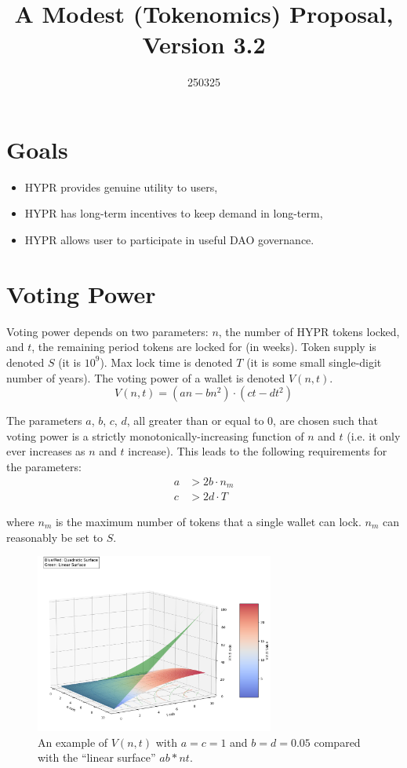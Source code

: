 \documentclass{article}
\title{A Modest (Tokenomics) Proposal, Version 3.2}
\date{250325}
\author{}
\begin{document}
\maketitle

\section{Goals}\label{sec:goals}
\begin{itemize}
    \item HYPR provides genuine utility to users,
    \item HYPR has long-term incentives to keep demand in long-term,
    \item HYPR allows user to participate in useful DAO governance.
\end{itemize}

\section{Voting Power}\label{sec:votingpower}

Voting power depends on two parameters: $n$, the number of HYPR tokens locked, and $t$, the remaining period tokens are locked for (in weeks).
Token supply is denoted $S$ (it is $10^9$).
Max lock time is denoted $T$ (it is some small single-digit number of years).
The voting power of a wallet is denoted $V(n, t)$.
\begin{equation}
V(n, t) = (an - bn^2) \cdot (ct - dt^2)
\end{equation}

The parameters $a$, $b$, $c$, $d$, all greater than or equal to $0$, are chosen such that voting power is a strictly monotonically-increasing function of $n$ and $t$ (i.e. it only ever increases as $n$ and $t$ increase).
This leads to the following requirements for the parameters:
\begin{align}
a &> 2b \cdot n_m\\
c &> 2d \cdot T
\end{align}

where $n_m$ is the maximum number of tokens that a single wallet can lock.
$n_m$ can reasonably be set to $S$.

\begin{figure}[h]
    \centering
    \includegraphics[width=0.7\textwidth]{voting-power-surface.png}
    \caption{An example of $V(n, t)$ with $a = c = 1$ and $b = d = 0.05$ compared with the ``linear surface'' $ab * nt$.}
    \label{fig:example-image}
\end{figure}
\end{document}
